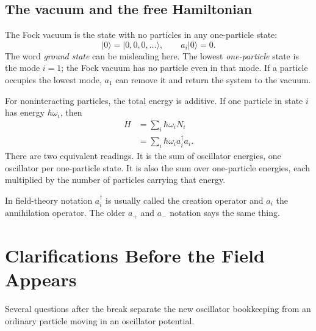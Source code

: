 \subsection{The vacuum and the free Hamiltonian}

The Fock vacuum is the state with no particles in any one-particle state:
\begin{equation}
|0\rangle=|0,0,0,\ldots\rangle,
\qquad a_i|0\rangle=0.
\end{equation}
The word \emph{ground state} can be misleading here. The lowest \emph{one-particle} state is the mode \(i=1\); the Fock vacuum has no particle even in that mode. If a particle occupies the lowest mode, \(a_1\) can remove it and return the system to the vacuum.

\begin{classroomqa}
\end{classroomqa}

For noninteracting particles, the total energy is additive. If one particle in state \(i\) has energy \(\hbar\omega_i\), then
\begin{align}
H
&=\sum_i \hbar\omega_i N_i \\
&=\sum_i \hbar\omega_i a_i^\dagger a_i.
\label{eq:l06-free-fock-hamiltonian}
\end{align}
There are two equivalent readings. It is the sum of oscillator energies, one oscillator per one-particle state. It is also the sum over one-particle energies, each multiplied by the number of particles carrying that energy.

In field-theory notation \(a_i^\dagger\) is usually called the creation operator and \(a_i\) the annihilation operator. The older \(a_+\) and \(a_-\) notation says the same thing.

\section{Clarifications Before the Field Appears}

Several questions after the break separate the new oscillator bookkeeping from an ordinary particle moving in an oscillator potential.

